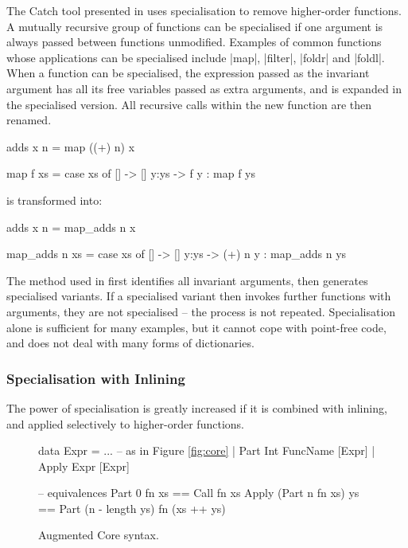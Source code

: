 The Catch tool presented in \cite{me:catch_tfp} uses specialisation to remove higher-order functions. A mutually recursive group of functions can be specialised if one argument is always passed between functions unmodified. Examples of common functions whose applications can be specialised include |map|, |filter|, |foldr| and |foldl|. When a function can be specialised, the expression passed as the invariant argument has all its free variables passed as extra arguments, and is expanded in the specialised version. All recursive calls within the new function are then renamed.

\begin{example}
\begin{code}
adds x n = map ((+) n) x

map f xs = case  xs of
                 []    -> []
                 y:ys  -> f y : map f ys
\end{code}

\noindent is transformed into:

\begin{code}
adds x n = map_adds n x

map_adds n xs = case  xs of
                      []    -> []
                      y:ys  -> (+) n y : map_adds n ys
\end{code}
\end{example}

The method used in \cite{me:catch_tfp} first identifies all invariant arguments, then generates specialised variants. If a specialised variant then invokes further functions with arguments, they are not specialised -- the process is not repeated. Specialisation alone is sufficient for many examples, but it cannot cope with point-free code, and does not deal with many forms of dictionaries.

\subsubsection{Specialisation with Inlining}

The power of specialisation is greatly increased if it is combined with inlining, and applied selectively to higher-order functions.

\begin{figure}
\ignore\begin{code}
data Expr  =  ... -- as in Figure {\ref{fig:core}}
           |  Part   Int FuncName [Expr]
           |  Apply  Expr [Expr]

-- equivalences
Part 0 fn xs == Call fn xs
Apply (Part n fn xs) ys == Part (n - length ys) fn (xs ++ ys)
\end{code}
\caption{Augmented Core syntax.}
\label{fig:core_ho}
\end{figure}

